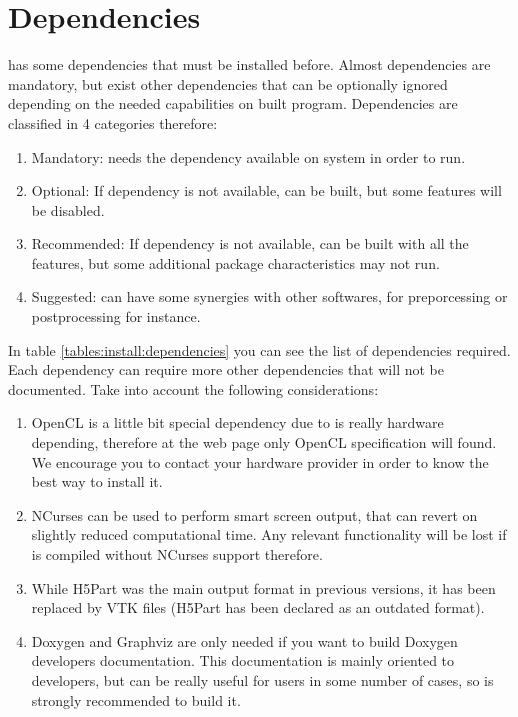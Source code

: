 \section{Dependencies}
%
\NAME has some dependencies that must be installed before. Almost dependencies
are mandatory, but exist other dependencies that can be optionally ignored
depending on the needed capabilities on \NAME built program.\rc
%
Dependencies are classified in 4 categories therefore:
%
\begin{enumerate}
	\item Mandatory: \NAME needs the dependency available on system in order to
	run.
	\item Optional: If dependency is not available, \NAME can be built, but some
	features will be disabled.
	\item Recommended: If dependency is not available, \NAME can be built with
	all the features, but some
	additional package characteristics may not run.
	\item Suggested: \NAME can have some synergies with other softwares, for
	preporcessing or postprocessing for instance.
\end{enumerate}
%
In table \ref{tables:install:dependencies} you can see the list of dependencies
required. Each dependency can require more other dependencies that will not be
documented. Take into account the following considerations:
%
\begin{enumerate}
	\item OpenCL is a little bit special dependency due to is really hardware
	depending, therefore at the web page only OpenCL specification will found.
	We encourage you to contact your hardware provider in order to know the
	best way to install it.
	\item NCurses can be used to perform smart screen output, that can revert
	on slightly reduced computational time. Any relevant functionality will
	be lost if \NAME is compiled without NCurses support therefore.
	\item While H5Part was the main \NAME output format in previous versions, 
	it has been replaced by VTK files (H5Part has been declared as an outdated 
	format).
	\item Doxygen and Graphviz are only needed if you want to build Doxygen
	developers documentation. This documentation is mainly oriented to 
	developers, but can be really useful for users in some number of cases, so 
	is strongly recommended to build it.
\end{enumerate}
%
